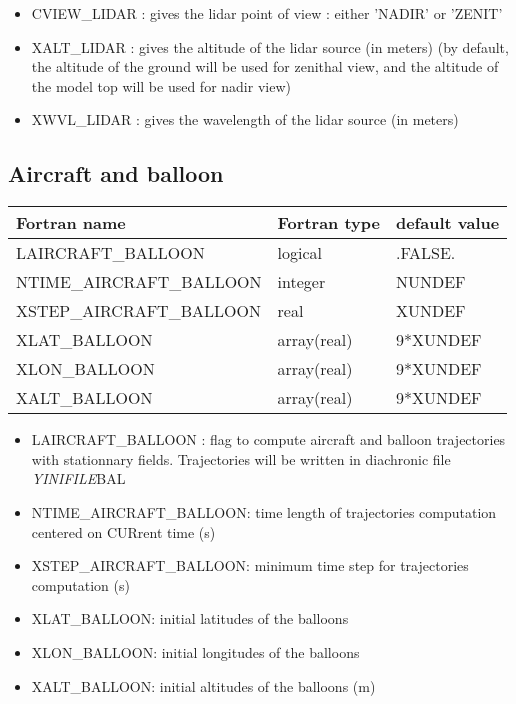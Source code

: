 \begin{itemize}
\item CVIEW\_LIDAR : gives the lidar point of view : either 'NADIR' or 'ZENIT'
\item XALT\_LIDAR : gives the altitude of the lidar source  (in meters)  (by default, the altitude of the ground
will be used for zenithal view, and the altitude of the model top will be used for nadir view) 
\item XWVL\_LIDAR : gives the wavelength of the lidar source (in meters)
\end{itemize}

\subsection{Aircraft and balloon}
\begin{center}
\begin{tabular} {|l|l|l|}
\hline
Fortran name  & Fortran type & default value \\
\hline
LAIRCRAFT\_BALLOON       & logical     & .FALSE.   \\
NTIME\_AIRCRAFT\_BALLOON & integer     & NUNDEF    \\
XSTEP\_AIRCRAFT\_BALLOON & real        & XUNDEF    \\
XLAT\_BALLOON            & array(real) & 9*XUNDEF  \\
XLON\_BALLOON            & array(real) & 9*XUNDEF  \\
XALT\_BALLOON            & array(real) & 9*XUNDEF  \\
\hline
\end{tabular}
\end{center}
\begin{itemize}
\item LAIRCRAFT\_BALLOON :  flag to compute aircraft and balloon trajectories
with stationnary fields.
Trajectories will be written in diachronic file {\it YINIFILE}BAL
\item NTIME\_AIRCRAFT\_BALLOON: time length of trajectories computation 
centered on CURrent time (s)
\item XSTEP\_AIRCRAFT\_BALLOON: minimum time step for trajectories computation (s)
\item XLAT\_BALLOON: initial latitudes of the balloons
\item XLON\_BALLOON: initial longitudes of the balloons
\item XALT\_BALLOON: initial altitudes of the balloons (m)
\end{itemize}

